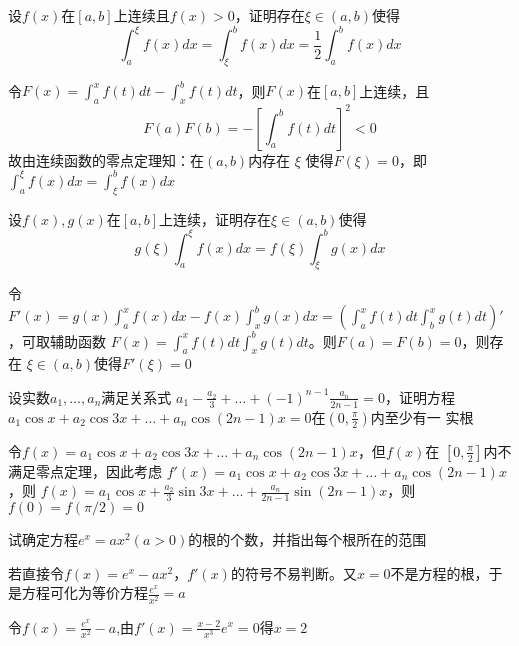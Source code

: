\documentclass{article}
\begin{document}
\begin{examplle}[]
设\(f(x)\)在\([a,b]\)上连续且\(f(x)>0\)，证明存在\(\xi\in(a,b)\)使得
\begin{equation*}
\int_a^\xi f(x)dx=\int_\xi^bf(x)dx=\frac{1}{2}\int_a^bf(x)dx
\end{equation*}

令\(F(x)=\int_a^xf(t)dt-\int_x^bf(t)dt\)，则\(F(x)\)在\([a,b]\)上连续，且
\begin{equation*}
F(a)F(b)=-\left[\int_a^bf(t)dt\right]^2<0
\end{equation*}
故由连续函数的零点定理知：在\((a,b)\)内存在 \(\xi\) 使得\(F(\xi)=0\)，即\(\int_a^\xi f(x)dx=\int_\xi^bf(x)dx\)
\end{examplle}

\begin{examplle}[]
设\(f(x),g(x)\)在\([a,b]\)上连续，证明存在\(\xi\in(a,b)\)使得
\begin{equation*}
g(\xi)\int_a^\xi f(x)dx=f(\xi)\int_\xi^bg(x)dx
\end{equation*}

令\(F'(x)=g(x)\int_a^x
  f(x)dx-f(x)\int_x^bg(x)dx=(\int^x_af(t)dt\int_b^xg(t)dt)'\)，可取辅助函数
\(F(x)=\int_a^xf(t)dt\int_x^bg(t)dt\)。则\(F(a)=F(b)=0\)，则存在
\(\xi\in(a,b)\)使得\(F'(\xi)=0\)
\end{examplle}

\begin{examplle}[]
设实数\(a_1,\dots,a_n\)满足关系式
\(a_1-\frac{a_2}{3}+\dots+(-1)^{n-1}\frac{a_n}{2n-1}=0\)，证明方程
\(a_1\cos x+a_2\cos 3x+\dots+a_n\cos(2n-1)x=0\)在\((0,\frac{\pi}{2})\)内至少有一
实根

令\(f(x)=a_1\cos x+a_2\cos 3x+\dots+a_n\cos(2n-1)x\)，但\(f(x)\)在
\([0,\frac{\pi}{2}]\)内不满足零点定理，因此考虑
\(f'(x)=a_1\cos x+a_2\cos 3x+\dots+a_n\cos(2n-1)x\)，则
\(f(x)=a_1\cos x+\frac{a_2}{3}\sin 3x+\dots+\frac{a_n}{2n-1}\sin(2n-1)x\)，则
\(f(0)=f(\pi/2)=0\)
\end{examplle}

\begin{examplle}[]
试确定方程\(e^x=ax^2(a>0)\)的根的个数，并指出每个根所在的范围

若直接令\(f(x)=e^x-ax^2\)，\(f'(x)\)的符号不易判断。又\(x=0\)不是方程的根，于
是方程可化为等价方程\(\frac{e^x}{x^2}=a\)

令\(f(x)=\frac{e^x}{x^2}-a\),由\(f'(x)=\frac{x-2}{x^3}e^x=0\)得\(x=2\)
\end{examplle}
\end{document}
